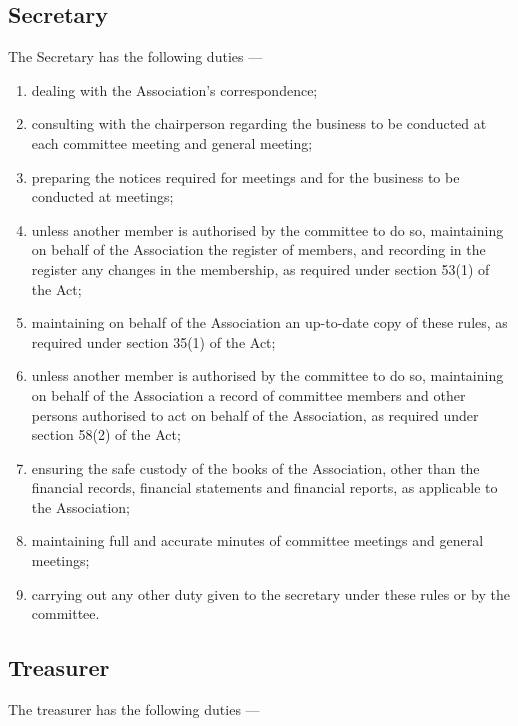 \documentclass[../constitution.tex]{subfiles}
\begin{document}
\hypertarget{secretary}{%
\subsection{Secretary}\label{secretary}}

The Secretary has the following duties ---

\begin{enumerate}
  \item dealing with the Association's correspondence;
  \item consulting with the chairperson regarding the business to be conducted at each committee meeting and general meeting;
  \item preparing the notices required for meetings and for the business to be conducted at meetings;
  \item unless another member is authorised by the committee to do so, maintaining on behalf of the Association the register of members, and recording in the register any changes in the membership, as required under section 53(1) of the Act;
  \item maintaining on behalf of the Association an up-to-date copy of these rules, as required under section 35(1) of the Act;
  \item unless another member is authorised by the committee to do so, maintaining on behalf of the Association a record of committee members and other persons authorised to act on behalf of the Association, as required under section 58(2) of the Act;
  \item ensuring the safe custody of the books of the Association, other than the financial records, financial statements and financial reports, as applicable to the Association;
  \item maintaining full and accurate minutes of committee meetings and general meetings;
  \item carrying out any other duty given to the secretary under these rules or by the committee.
\end{enumerate}

\hypertarget{treasurer}{%
\subsection{Treasurer}\label{treasurer}}

The treasurer has the following duties ---
\end{document}
